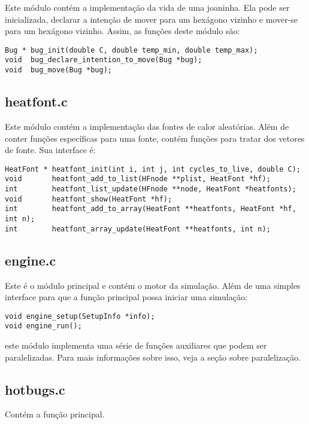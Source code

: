 \documentclass[a4paper,11pt]{article} %
\begin{document}
Este módulo contém a implementação da vida de uma joaninha. Ela pode ser inicializada, declarar a intenção de mover para um hexágono vizinho e mover-se para um hexágono vizinho. Assim, as funções deste módulo são:

\begin{verbatim}
Bug * bug_init(double C, double temp_min, double temp_max);
void  bug_declare_intention_to_move(Bug *bug);
void  bug_move(Bug *bug);
\end{verbatim}

\subsection{heatfont.c}

Este módulo contém a implementação das fontes de calor aleatórias. Além de conter funções específicas para uma fonte, contém funções para tratar dos vetores de fonte. Sua interface é:

\begin{verbatim}
HeatFont * heatfont_init(int i, int j, int cycles_to_live, double C);
void       heatfont_add_to_list(HFnode **plist, HeatFont *hf);
int        heatfont_list_update(HFnode **node, HeatFont *heatfonts);
void       heatfont_show(HeatFont *hf);
int        heatfont_add_to_array(HeatFont **heatfonts, HeatFont *hf, int n);
int        heatfont_array_update(HeatFont **heatfonts, int n);
\end{verbatim}

\subsection{engine.c}

Este é o módulo principal e contém o motor da simulação. Além de uma simples interface para que a função principal possa iniciar uma simulação:

\begin{verbatim}
void engine_setup(SetupInfo *info);
void engine_run();
\end{verbatim}

este módulo implementa uma série de funções auxiliares que podem ser paralelizadas. Para mais informações sobre isso, veja a seção sobre paralelização.

\subsection{hotbugs.c}

Contém a função principal.
\end{document}
